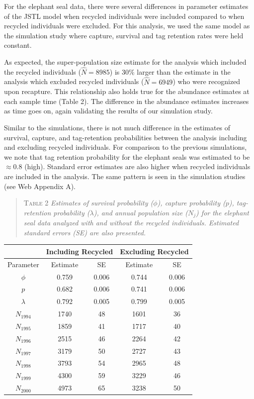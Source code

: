\documentclass[12pt]{article}
\begin{document}
For the elephant seal data, there were several differences in parameter
estimates of the JSTL model when recycled individuals were included
compared to when recycled individuals were excluded. For this analysis, we used the same model as the simulation study where capture, survival and tag retention rates were held constant.  

As expected, the
super-population size estimate for the analysis which included the
recycled individuals ($\hat{N}=8985$) is 30\% larger than the estimate in the analysis
which excluded recycled individuals ($\hat{N}=6949$) who were recognized upon recapture. This relationship also holds true for the abundance estimates
at each sample time (Table 2). The difference in the abundance estimates increases
 as time goes on, again validating the results of our
simulation study.

Similar to the simulations, there is not much difference in the
estimates of survival, capture, and tag-retention probabilities between the analysis
including and excluding recycled individuals. For comparison to the previous
simulations, we note that tag retention probability for the
elephant seals was estimated to be $\approx 0.8$ (high).  Standard error estimates are also higher when recycled individuals are included in the analysis. The same pattern is seen in the simulation studies (see Web Appendix A).

\begin{quote}
\textsc{Table 2}
\textsl{Estimates of survival probability ($\phi$), capture probability ($p$), tag-retention probability ($\lambda$), and annual population size ($N_j$) for the elephant seal data analyzed with and without the recycled individuals. Estimated standard errors (SE) are also presented.}
\end{quote}

\begin{center}
\begin{tabular}{c c c c c}
& \multicolumn{2}{l}{Including Recycled} & \multicolumn{2}{l}{Excluding Recycled} \\ \hline
Parameter & Estimate & SE & Estimate & SE \\ \hline
$\phi$ & 0.759 & 0.006 & 0.744 & 0.006\\
$p$ & 0.682 & 0.006 & 0.741 & 0.006 \\
$\lambda $ & 0.792 & 0.005 & 0.799 & 0.005\\ \hline
$N_{1994}$ & 1740 & 48 & 1601 & 36 \\
$N_{1995}$ & 1859 & 41 & 1717 & 40 \\
$N_{1996}$ & 2515 & 46 & 2264 & 42 \\
$N_{1997}$ & 3179 & 50 & 2727 & 43 \\
$N_{1998}$ & 3793 & 54 & 2965 & 48 \\
$N_{1999}$ & 4300 & 59 & 3229 & 46 \\
$N_{2000}$ & 4973 & 65 & 3238 & 50 \\ \hline
\end{tabular}
\end{center}
\end{document}
